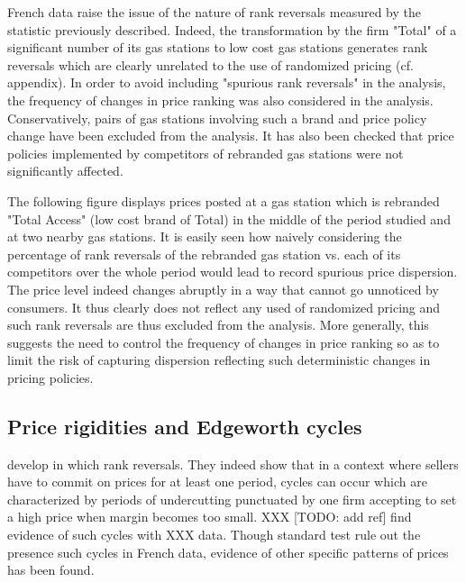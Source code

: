 \documentclass[english]{article}
\begin{document}
French data raise the issue of the nature of rank reversals measured by the statistic previously described. Indeed, the transformation by the firm "Total" of a significant number of its gas stations to low cost gas stations generates rank reversals which are clearly unrelated to the use of randomized pricing (cf. appendix). In order to avoid including "spurious rank reversals" in the analysis, the frequency of changes in price ranking was also considered in the analysis. Conservatively, pairs of gas stations involving such a brand and price policy change have been excluded from the analysis. It has also been checked that price policies implemented by competitors of rebranded gas stations were not significantly affected.

The following figure displays prices posted at a gas station which is rebranded "Total Access" (low cost brand of Total) in the middle of the period studied and at two nearby gas stations. It is easily seen how naively considering the percentage of rank reversals of the rebranded gas station vs. each of its competitors over the whole period would lead to record spurious price dispersion. The price level indeed changes abruptly in a way that cannot go unnoticed by consumers. It thus clearly does not reflect any used of randomized pricing and such rank reversals are thus excluded from the analysis. More generally, this suggests the need to control the frequency of changes in price ranking so as to limit the risk of capturing dispersion reflecting such deterministic changes in pricing policies.

\subsection{Price rigidities and Edgeworth cycles}

\cite{MAS88} develop in which rank reversals. They indeed show that in a context where sellers have to commit on prices for at least one period, cycles can occur which are characterized by periods of undercutting punctuated by one firm accepting to set a high price when margin becomes too small. XXX [TODO: add ref] find evidence of such cycles with XXX data. Though standard test rule out the presence such cycles in French data, evidence of other specific patterns of prices has been found.
\end{document}
